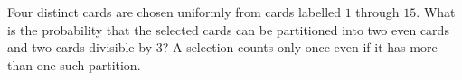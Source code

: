 Four distinct cards are chosen uniformly from cards labelled $1$ through $15$. What is the probability that the selected cards can be partitioned into two even cards and two cards divisible by $3$? A selection counts only once even if it has more than one such partition.
